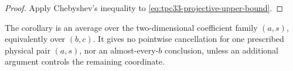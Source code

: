 \begin{proof}
Apply Chebyshev's inequality to
\eqref{eq:tpc33-projective-upper-bound}.
\end{proof}

The corollary is an average over the two-dimensional coefficient family
\((a,s)\), equivalently over \((b,c)\).  It gives no pointwise cancellation
for one prescribed physical pair \((a,s)\), nor an almost-every-\(b\)
conclusion, unless an additional argument controls the remaining coordinate.
